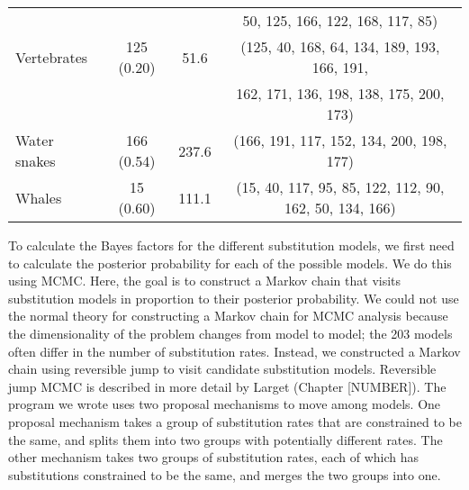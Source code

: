\documentclass{svmult}
\begin{document}
\begin{table}[b]
\begin{tabular}{l c c c}
                             &            &       & 50, 125, 166, 122, 168, 117, 85) \\
Vertebrates               & 125 (0.20) &  51.6 & (125, 40, 168, 64, 134, 189, 193, 166, 191, \\
                             &            &       & 162, 171, 136, 198, 138, 175, 200, 173) \\ 
Water snakes               & 166 (0.54) & 237.6 & (166, 191, 117, 152, 134, 200, 198, 177) \\ 
Whales                    &  15 (0.60) & 111.1 & (15, 40, 117, 95, 85, 122, 112, 90, 162, 50, 134, 166) \\
\hline
\end{tabular}
\label{tab3}
\end{table}

To calculate the Bayes factors for the different substitution models, we first need to calculate the posterior probability for each of the possible models. We do this using MCMC.
Here, the goal is to construct a Markov chain that visits substitution models in proportion to their posterior probability. We could not use the normal theory for
constructing a Markov chain for MCMC analysis because the dimensionality of the problem changes from model to model; the 203 models often differ in the number
of substitution rates. Instead, we constructed a Markov chain using reversible jump to visit candidate substitution models. Reversible jump MCMC is described in 
more detail by Larget (Chapter [NUMBER]). The program we wrote uses two proposal mechanisms to move among models. One proposal mechanism takes a group
of substitution rates that are constrained to be the same, and splits them into two groups with potentially different rates. The other mechanism takes two groups of
substitution rates, each of which has substitutions constrained to be the same, and merges the two groups into one. 
\end{document}
